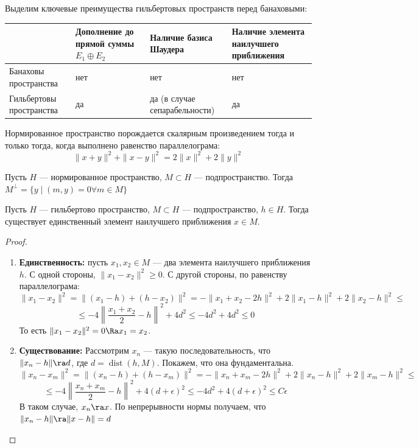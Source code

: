 \begin{note}
    Выделим ключевые преимущества гильбертовых пространств перед банаховыми:

    \begin{center}
        \begin{tabular}{|p{4cm}|p{4cm}|p{4cm}|p{4cm}|}
            \hline
            & Дополнение до прямой суммы \(E_1 \oplus E_2\) & Наличие базиса Шаудера & Наличие элемента наилучшего приближения \\
            \hline
            Банаховы пространства & нет & нет & нет \\
            \hline
            Гильбертовы пространства & да  & да (в случае сепарабельности) & да \\
            \hline
        \end{tabular}
    \end{center}
\end{note}

\begin{theorem}[б/д]
    Нормированное пространство порождается скалярным произведением тогда и только тогда, когда выполнено равенство параллелограма:
    \[\|x + y\|^2 + \|x - y\|^2 = 2\|x\|^2 + 2\|y\|^2\]
\end{theorem}

\begin{definition}
    Пусть \(H\) --- нормированное пространство, \(M \subset H\) --- подпространство. Тогда \(M^\perp = \{y\;|\;(m, y) = 0 \forall m \in M\}\)
\end{definition}

\begin{lemma}
    Пусть \(H\) --- гильбертово пространство, \(M \subset H\) --- подпространство, \(h \in H\). Тогда существует единственный элемент наилучшего приближения \(x \in M\).
\end{lemma}
\begin{proof}
    \begin{enumerate}
        \item[] \textbf{Единственность:} пусть \(x_1, x_2 \in M\) --- два элемента наилучшего приближения \(h\). С одной стороны, \(\|x_1 - x_2\|^2 \ge 0\). С другой стороны, по равенству параллелограма:
        \[\|x_1 - x_2\|^2 = \|(x_1 - h) + (h - x_2)\|^2 = -\|x_1 + x_2 - 2h\|^2 + 2 \|x_1 - h\|^2 + 2 \|x_2 - h\|^2 \le\]
        \[\le -4\left\|\frac{x_1 + x_2}{2} - h\right\|^2 + 4d^2 \le -4d^2 + 4d^2 \le 0\]
        То есть \(\|x_1 - x_2\|^2 = 0 \Ra x_1 = x_2\).
        \item[] \textbf{Существование:} Рассмотрим \(x_n\) --- такую последовательность, что \(\|x_n - h\| \ra d\), где \(d = \operatorname{dist}(h, M)\). Покажем, что она фундаментальна. 
        \[\|x_n - x_m\|^2 = \|(x_n - h) + (h - x_m)\|^2 = -\|x_n + x_m - 2h\|^2 + 2 \|x_n - h\|^2 + 2 \|x_m - h\|^2 \le\]
        \[\le -4\left\|\frac{x_n + x_m}{2} - h\right\|^2 + 4(d + \epsilon)^2 \le -4d^2 + 4(d + \epsilon)^2 \le C\epsilon\]
        В таком случае, \(x_n \ra x\). По непрерывности нормы получаем, что \(\|x_n - h\| \ra \|x - h\| = d\)
    \end{enumerate}
\end{proof}

